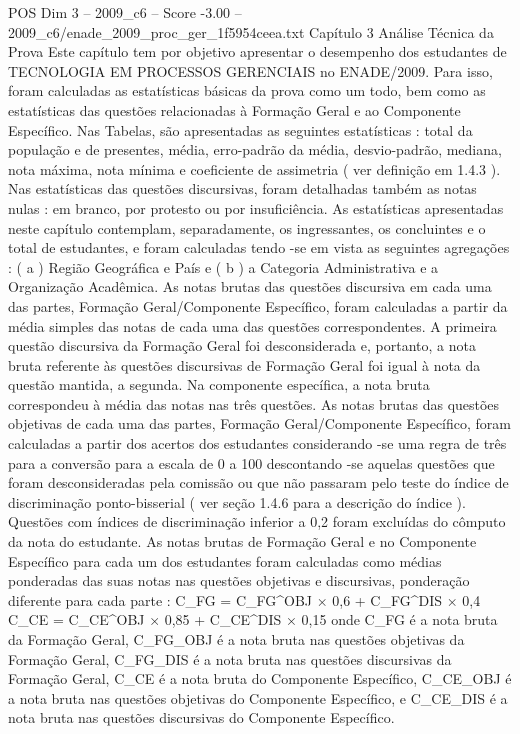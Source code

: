 \begin{textsample}{POS Dim 3 – 2009\_c6 – Score -3.00 – 2009\_c6/enade\_2009\_proc\_ger\_1f5954ceea.txt}  \label{ex:f3_pos_242}
Capítulo 3 Análise Técnica da Prova Este capítulo tem por objetivo apresentar o desempenho dos estudantes de TECNOLOGIA EM PROCESSOS GERENCIAIS no ENADE/2009.
Para isso, foram calculadas as estatísticas básicas da prova como um todo, bem como as estatísticas das questões relacionadas à Formação Geral e ao Componente Específico.
Nas Tabelas, são apresentadas as seguintes estatísticas : total da população e de presentes, média, erro-padrão da média, desvio-padrão, mediana, nota máxima, nota mínima e coeficiente de assimetria ( ver definição em 1.4.3 ).
Nas estatísticas das questões discursivas, foram detalhadas também as notas nulas : em branco, por protesto ou por insuficiência.
As estatísticas apresentadas neste capítulo contemplam, separadamente, os ingressantes, os concluintes e o total de estudantes, e foram calculadas tendo -se em vista as seguintes agregações : ( a ) Região Geográfica e País e ( b ) a Categoria Administrativa e a Organização Acadêmica.
As notas brutas das questões discursiva em cada uma das partes, Formação Geral/Componente Específico, foram calculadas a partir da média simples das notas de cada uma das questões correspondentes.
A primeira questão discursiva da Formação Geral foi desconsiderada e, portanto, a nota bruta referente às questões discursivas de Formação Geral foi igual à nota da questão mantida, a segunda.
Na componente específica, a nota bruta correspondeu à média das notas nas três questões.
As notas brutas das questões objetivas de cada uma das partes, Formação Geral/Componente Específico, foram calculadas a partir dos acertos dos estudantes considerando -se uma regra de três para a conversão para a escala de 0 a 100 descontando -se aquelas questões que foram desconsideradas pela comissão ou que não passaram pelo teste do índice de discriminação ponto-bisserial ( ver seção 1.4.6 para a descrição do índice ).
Questões com índices de discriminação inferior a 0,2 foram excluídas do cômputo da nota do estudante.
As notas brutas de Formação Geral e no Componente Específico para cada um dos estudantes foram calculadas como médias ponderadas das suas notas nas questões objetivas e discursivas, ponderação diferente para cada parte : C\_FG = C\_FG\textasciicircum{}OBJ × 0,6 + C\_FG\textasciicircum{}DIS × 0,4 C\_CE = C\_CE\textasciicircum{}OBJ × 0,85 + C\_CE\textasciicircum{}DIS × 0,15 onde C\_FG é a nota bruta da Formação Geral, C\_FG\_OBJ é a nota bruta nas questões objetivas da Formação Geral, C\_FG\_DIS é a nota bruta nas questões discursivas da Formação Geral, C\_CE é a nota bruta do Componente Específico, C\_CE\_OBJ é a nota bruta nas questões objetivas do Componente Específico, e C\_CE\_DIS é a nota bruta nas questões discursivas do Componente Específico.

\end{textsample}
